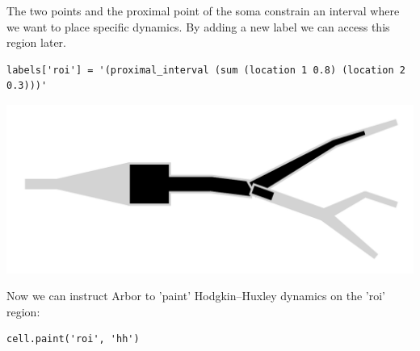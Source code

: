 \documentclass{beamer}
\newcommand*\circled[1]{\tikz[baseline=(char.base)]{\node[shape=circle,fill,inner sep=2pt] (char) {\textcolor{white}{#1}};}} %
\begin{document}
\begin{frame}[t, fragile]
\begin{columns}[onlytextwidth,T]
        \begin{column}{0.3\textwidth}
          \circled{3} The two points and the proximal point of the soma constrain an interval where we want to place specific dynamics. By adding a new label we can access this region later.
\begin{verbatim}
labels['roi'] = '(proximal_interval (sum (location 1 0.8) (location 2 0.3)))'
\end{verbatim}
          \begin{center}\includegraphics[width=0.8\linewidth]{scripts/region.pdf}\end{center}
          Now we can instruct Arbor to 'paint' Hodgkin–Huxley dynamics on the 'roi' region:
\begin{verbatim}
cell.paint('roi', 'hh')
\end{verbatim}
        \end{column}

      \end{columns}


\end{frame}
\end{document}
